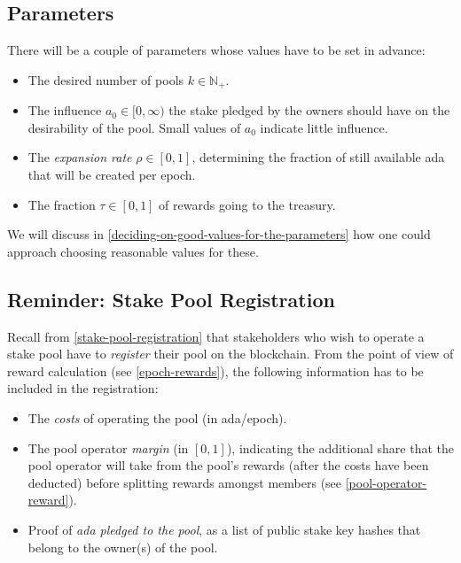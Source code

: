 \documentclass[11pt,a4paper,dvipsnames,twosided]{article}
\begin{document}
\subsection{Parameters}
\label{parameters}

There will be a couple of parameters whose values have to be set in
advance:

\begin{itemize}
\item
  The desired number of pools \(k\in\mathbb{N}_+\).
\item
  The influence \(a_0\in[0,\infty)\) the stake pledged by the owners should have
    on the desirability of the pool. Small values of \(a_0\) indicate little
    influence.
\item
  The \emph{expansion rate} \(\rho\in[0,1]\), determining the fraction
  of still available ada that will be created per epoch.
\item
  The fraction \(\tau\in[0,1]\) of rewards going to the treasury.
\end{itemize}

We will discuss
in \cref{deciding-on-good-values-for-the-parameters} how one
could approach choosing reasonable values for these.

\subsection{Reminder: Stake Pool Registration}
\label{reminder-stake-pool-registration}

Recall from \cref{stake-pool-registration} that stakeholders
who wish to operate a stake pool have to \emph{register} their
pool on the blockchain. From the point of view of reward calculation
(see \cref{epoch-rewards}), the following information has to
be included in the registration:

\begin{itemize}
\item
  The \emph{costs} of operating the pool (in ada/epoch).
\item
  The pool operator \emph{margin} (in \([0,1]\)), indicating the additional
  share that the pool operator will take from the pool's rewards (after the
  costs have been deducted) before splitting rewards amongst members (see
  \cref{pool-operator-reward}).
\item
  Proof of \emph{ada pledged to the pool}, as a list of public stake
  key hashes that belong to the owner(s) of the pool.
\end{itemize}
\end{document}
